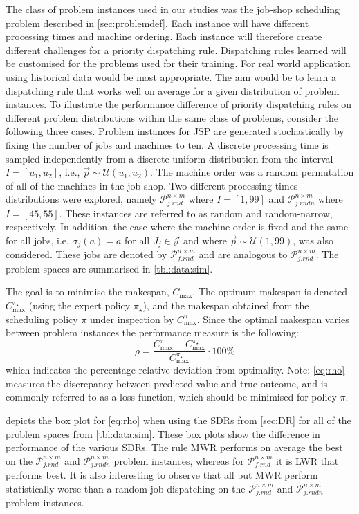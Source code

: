 \documentclass[twocolumn]{svjour3}
\newcommand{\Problem}[2][ ]{$\mathcal{P}_{#2}^{#1}$}
\newcommand{\jrnd}[2]{\Problem[#1 \times #2]{j.rnd}}
\newcommand{\jrndn}[2]{\Problem[#1 \times #2]{j.rndn}}
\newcommand{\frnd}[2]{\Problem[#1 \times #2]{f.rnd}}
\newcommand{\dr}{dispatching rule}
\begin{document}
The class of problem instances used in our studies was the job-shop scheduling 
problem described in \cref{sec:problemdef}. Each instance will have 
different processing times and machine ordering. Each instance will 
therefore create different challenges for a priority dispatching rule. 
Dispatching rules learned will be customised for the problems used for their 
training. For real world application using historical data would be most 
appropriate. The aim would be to learn a dispatching rule that works well on 
average for a given distribution of problem instances. 
To illustrate the performance difference of priority \dr s on different 
problem distributions within the same class of problems, 
consider the following three cases.
Problem instances for JSP are generated stochastically by fixing the number of 
jobs and machines to ten. A discrete processing time is sampled independently 
from a discrete uniform distribution from the interval $I=[u_1,u_2]$, i.e., 
$\vec{p}\sim \mathcal{U}(u_1,u_2)$. 
The machine order was a random permutation of all of the machines in the 
job-shop. Two different processing times distributions were explored, namely 
\jrnd{n}{m} where $I=[1,99]$ and \jrndn{n}{m} where $I=[45,55]$. These 
instances are referred to as random and random-narrow, respectively. 
In addition, the case where the machine order is fixed and the same for 
all jobs, i.e. $\sigma_j(a)=a$ for all $J_j\in\mathcal{J}$ and where 
$\vec{p}\sim\mathcal{U}(1,99)$, was also considered. 
These jobs are denoted by \frnd{n}{m} and are analogous to \jrnd{n}{m}.
The problem spaces are summarised in \cref{tbl:data:sim}.

The goal is to minimise the makespan, $C_{\max}$. The optimum 
makespan is denoted $C_{\max}^{\pi_\star}$ (using the expert policy 
$\pi_\star$), and the makespan obtained from the 
scheduling policy $\pi$ under inspection by $C_{\max}^{\pi}$. Since the optimal 
makespan varies between problem instances the performance measure is the 
following:
\begin{equation}\quad\label{eq:rho}
\rho=\frac{C_{\max}^{\pi}-C_{\max}^{\pi_\star}}{C_{\max}^{\pi_\star}}\cdot
100\%
\end{equation}
which indicates the percentage relative deviation from optimality. 
Note: \cref{eq:rho} measures the discrepancy between predicted value and true 
outcome, and is commonly referred to as a loss function, which should be 
minimised for policy $\pi$.

 depicts the box plot for \cref{eq:rho} when using the 
SDRs from \cref{sec:DR} for all of the problem spaces from \cref{tbl:data:sim}.
These box plots show the difference in performance of the various SDRs. The 
rule MWR performs on average the best on the \jrnd{n}{m} and \jrndn{n}{m} 
problem instances, whereas for \frnd{n}{m} it is LWR that performs best. It is 
also interesting to observe that all but MWR perform statistically worse than a 
random job dispatching on the \jrnd{n}{m} and \jrndn{n}{m} problem instances.
\end{document}
